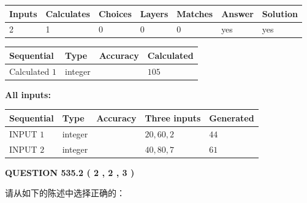 \documentclass{ctexart}
\begin{document}
 
\noindent{}
 
 

 
   
   
   
   
\noindent\begin{tabular}{|l|l|l|l|l|l|l|}
 \hline
Inputs & Calculates & Choices & Layers & Matches & Answer & Solution \\ \hline
 2  & 
 1  & 
 0
  & 
 0  & 
 0  & 
  yes & 
  yes 
  \\ \hline
 \end{tabular}
   
   
   
   
\noindent{}
   
   
  
  
\noindent\begin{tabular}{|l|l|l|l|}
\hline
 Sequential & Type & Accuracy & Calculated \\ 
\hline
 
 
  Calculated $  1 $ & integer &  & 
  $ 105 $ 
 \\  \hline  
 \end{tabular}
   
   
   
   
\noindent\vspace{0.1in}\hspace{-0.08in} {\textbf{\Large{All inputs: }}}
   
   
  
  
\noindent\begin{tabular}{|l|l|l|l|l|}
\hline
 Sequential & Type & Accuracy & Three inputs & Generated \\ 
\hline
 
 
  INPUT $  1 $ & integer &  & $
 20
 , 
 60
 , 
 2
 $ & $ 44 $ 
 \\  \hline  
 
 
  INPUT $  2 $ & integer &  & $
 40
 , 
 80
 , 
 7
 $ & $ 61 $ 
 \\  \hline  
 \end{tabular}
   
   
  
\vspace{0.2in}
  
{\textbf{\Large{QUESTION
535.2 
 ( 2 , 2 , 3 )
}}}
  
  
请从如下的陈述中选择正确的：
 
\end{document}
